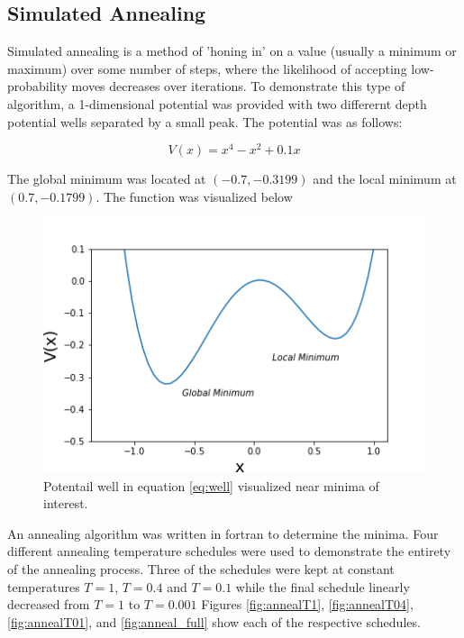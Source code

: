 \documentclass[twocolumn]{article}
\begin{document}
\subsection{Simulated Annealing}
Simulated annealing is a method of 'honing in' on a value (usually a minimum or maximum) over some number of steps, where the likelihood of accepting low-probability moves decreases over iterations. To demonstrate this type of algorithm, a 1-dimensional potential was provided with two differernt depth potential wells separated by a small peak. The potential was as follows:

\begin{equation}
{V(x) = x^4 - x^2 + 0.1x}
\label{eq:well}
\end{equation}

The global minimum was located at $(-0.7,-0.3199)$ and the local minimum at $(0.7, -0.1799)$. The function was visualized below

\begin{figure}
\centering
\includegraphics[width=\linewidth]{PotentialWell}
\caption{Potentail well in equation \ref{eq:well} visualized near minima of interest.}
\label{fig:PotentialWell}
\end{figure}

An annealing algorithm was written in fortran to determine the minima. Four different annealing temperature schedules were used to demonstrate the entirety of the annealing process. Three of the schedules were kept at constant temperatures $T=1$, $T=0.4$ and $T=0.1$ while the final schedule linearly decreased from $T=1$ to $T=0.001$ Figures \ref{fig:annealT1}, \ref{fig:annealT04}, \ref{fig:annealT01}, and \ref{fig:anneal_full} show each of the respective schedules.
\end{document}
